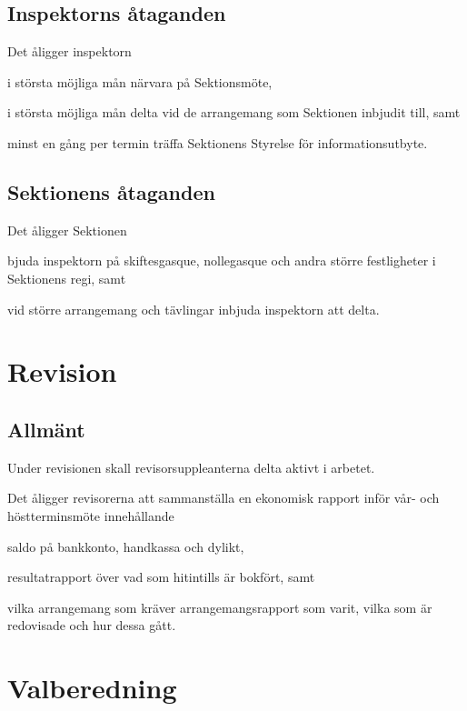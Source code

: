 \documentclass[10pt]{article}
\begin{document}
\subsection{Inspektorns åtaganden}
Det åligger inspektorn

\begin{attlist}
    \item i största möjliga mån närvara på Sektionsmöte,
    \item i största möjliga mån delta vid de arrangemang som Sektionen
        inbjudit till, samt
    \item minst en gång per termin träffa Sektionens Styrelse för
        informationsutbyte.
\end{attlist}

\subsection{Sektionens åtaganden}
Det åligger Sektionen
\begin{attlist}
    \item bjuda inspektorn på skiftesgasque, nollegasque och andra större
        festligheter i Sektionens regi, samt
    \item vid större arrangemang och tävlingar inbjuda inspektorn att delta.
\end{attlist}

\section{Revision} %
\subsection{Allmänt}
Under revisionen skall revisorsuppleanterna delta aktivt i arbetet.

Det åligger revisorerna att sammanställa en ekonomisk rapport inför vår-
och höstterminsmöte innehållande
\begin{alphlist}
    \item saldo på bankkonto, handkassa och dylikt,
    \item resultatrapport över vad som hitintills är bokfört, samt
    \item vilka arrangemang som kräver arrangemangsrapport som varit,
        vilka som är redovisade och hur dessa gått.
\end{alphlist}

\section{Valberedning} %
\end{document}
